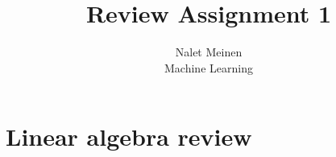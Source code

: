 \documentclass[12pt]{article}
\begin{document}


\title{Review Assignment 1}%
\author{Nalet Meinen \\ %
Machine Learning
}

\maketitle

\section{Linear algebra review}
\end{document}
